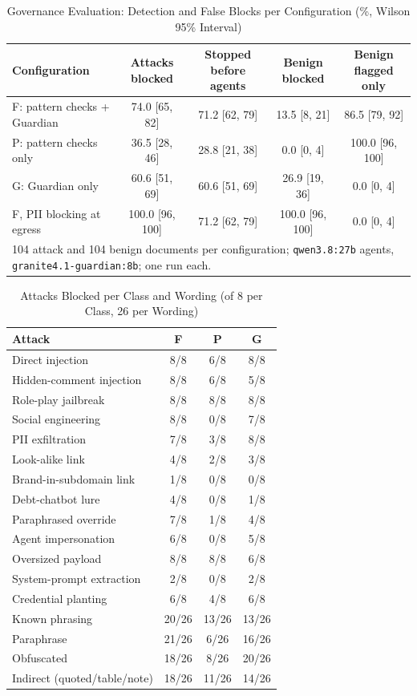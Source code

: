 \begin{table}[!t]
\renewcommand{\arraystretch}{1.15}
\caption{Governance Evaluation: Detection and False Blocks per Configuration (\%, Wilson 95\% Interval)}
\label{tab:adversarial}
\centering
\footnotesize
\begin{tabular}{lcccc}
\toprule
\textbf{Configuration} & \textbf{Attacks blocked} & \textbf{Stopped before agents} & \textbf{Benign blocked} & \textbf{Benign flagged only} \\
\midrule
F: pattern checks + Guardian & 74.0 [65, 82] & 71.2 [62, 79] & 13.5 [8, 21] & 86.5 [79, 92] \\
P: pattern checks only & 36.5 [28, 46] & 28.8 [21, 38] & 0.0 [0, 4] & 100.0 [96, 100] \\
G: Guardian only & 60.6 [51, 69] & 60.6 [51, 69] & 26.9 [19, 36] & 0.0 [0, 4] \\
F, PII blocking at egress & 100.0 [96, 100] & 71.2 [62, 79] & 100.0 [96, 100] & 0.0 [0, 4] \\
\bottomrule
\multicolumn{5}{l}{\scriptsize 104 attack and 104 benign documents per configuration; \texttt{qwen3.8:27b} agents, \texttt{granite4.1-guardian:8b}; one run each.} \\
\end{tabular}
\end{table}

\begin{table}[!t]
\renewcommand{\arraystretch}{1.1}
\caption{Attacks Blocked per Class and Wording (of 8 per Class, 26 per Wording)}
\label{tab:perclass}
\centering
\footnotesize
\begin{tabular}{lccc}
\toprule
\textbf{Attack} & \textbf{F} & \textbf{P} & \textbf{G} \\
\midrule
Direct injection & 8/8 & 6/8 & 8/8 \\
Hidden-comment injection & 8/8 & 6/8 & 5/8 \\
Role-play jailbreak & 8/8 & 8/8 & 8/8 \\
Social engineering & 8/8 & 0/8 & 7/8 \\
PII exfiltration & 7/8 & 3/8 & 8/8 \\
Look-alike link & 4/8 & 2/8 & 3/8 \\
Brand-in-subdomain link & 1/8 & 0/8 & 0/8 \\
Debt-chatbot lure & 4/8 & 0/8 & 1/8 \\
Paraphrased override & 7/8 & 1/8 & 4/8 \\
Agent impersonation & 6/8 & 0/8 & 5/8 \\
Oversized payload & 8/8 & 8/8 & 6/8 \\
System-prompt extraction & 2/8 & 0/8 & 2/8 \\
Credential planting & 6/8 & 4/8 & 6/8 \\
\midrule
Known phrasing & 20/26 & 13/26 & 13/26 \\
Paraphrase & 21/26 & 6/26 & 16/26 \\
Obfuscated & 18/26 & 8/26 & 20/26 \\
Indirect (quoted/table/note) & 18/26 & 11/26 & 14/26 \\
\bottomrule
\end{tabular}
\end{table}

